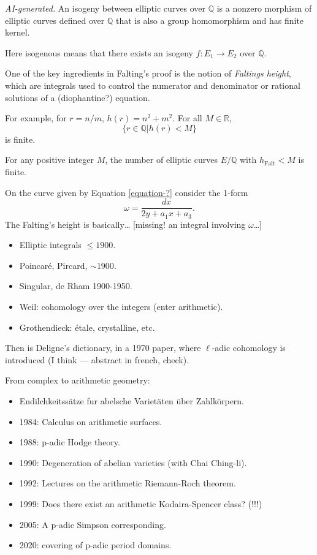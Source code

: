 \begin{definition}
\label{definition-isogeny}
{\it AI-generated.}
An isogeny between elliptic curves over
$\mathbb{Q}$ is a nonzero morphism of
elliptic curves defined over $\mathbb{Q}$
that is also a group homomorphism and has
finite kernel.
\end{definition}

Here isogenous means that there exists an
isogeny $f:E_1 \to E_2$ over $\mathbb{Q}$.

\medskip\noindent
One of the key ingredients
in Falting's proof
is the notion of {\it Faltings height},
which are integrals used to
control the numerator and denominator
or rational solutions of a (diophantine?)
equation.

For example, for $r = n/m$,
$h(r)=n^2+m^2$. For all $M \in \mathbb{R}$,
$$
\{r \in \mathbb{Q}| h(r)<M\}
$$
is finite.

\begin{proposition}
\label{proposition-faltings-height}
For any positive integer $M$,
the number of elliptic curves $E/\mathbb{Q}$
with $h_{\text{Falt}}<M$ is finite.
\end{proposition}

\noindent
On the curve given by Equation
\ref{equation-?}
consider the 1-form
$$
\omega=\frac{dx}{2y+a_1x+a_3}.
$$
The Falting's height is basically…
[missing! an integral involving $\omega$…]

\medskip\noindent
\begin{itemize}
\item Elliptic integrals $\leq 1900$.
\item Poincaré, Pircard, $\sim 1900$.
\item Singular, de Rham 1900-1950.
\item Weil: cohomology over the integers
(enter arithmetic).
\item Grothendieck: étale, crystalline, etc.
\end{itemize}

\noindent
Then is Deligne's dictionary,
in a 1970 paper, where $\ell$-adic
cohomology is introduced
(I think --- abstract in french, check).

\medskip\noindent
From complex to arithmetic geometry:

\begin{itemize}
\item Endilchkeitssätze
fur abelsche Varietäten über Zahlkörpern.
\item 1984: Calculus on arithmetic surfaces.
\item 1988: p-adic Hodge theory.
\item 1990: Degeneration of abelian
varieties (with Chai Ching-li).
\item 1992: Lectures on the
arithmetic Riemann-Roch theorem.
\item 1999: Does there exist an arithmetic
Kodaira-Spencer class? (!!!)
\item 2005: A p-adic Simpson corresponding.
\item 2020: covering of p-adic period
domains.
\end{itemize}

